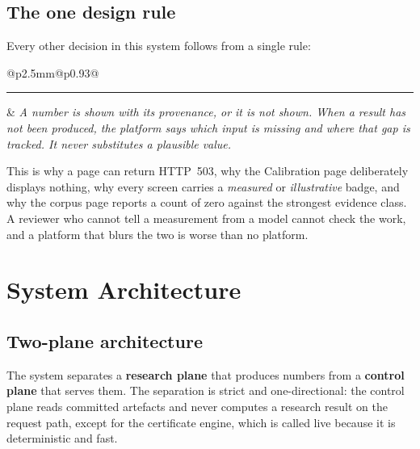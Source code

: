 \documentclass[11pt,a4paper]{article}
\makeatletter
\newcommand{\provbox}[1]{%
  \par\medskip\noindent
  \begin{tabular}{@{}p{2.5mm}@{\hspace{3mm}}p{0.93\linewidth}@{}}
  \textcolor{bridgecol}{\rule{2.5mm}{\baselineskip}} & \small\itshape #1
  \end{tabular}\par\medskip}
\makeatother
\begin{document}
\subsection{The one design rule}
Every other decision in this system follows from a single rule:

\provbox{A number is shown with its provenance, or it is not shown. When a
result has not been produced, the platform says which input is missing and where
that gap is tracked. It never substitutes a plausible value.}

This is why a page can return HTTP~503, why the Calibration page deliberately
displays nothing, why every screen carries a \emph{measured} or
\emph{illustrative} badge, and why the corpus page reports a count of zero
against the strongest evidence class. A reviewer who cannot tell a measurement
from a model cannot check the work, and a platform that blurs the two is worse
than no platform.

\section{System Architecture}
\label{sec:platform}

\subsection{Two-plane architecture}
The system separates a \textbf{research plane} that produces numbers from a
\textbf{control plane} that serves them. The separation is strict and
one-directional: the control plane reads committed artefacts and never computes
a research result on the request path, except for the certificate engine, which
is called live because it is deterministic and fast.
\end{document}
